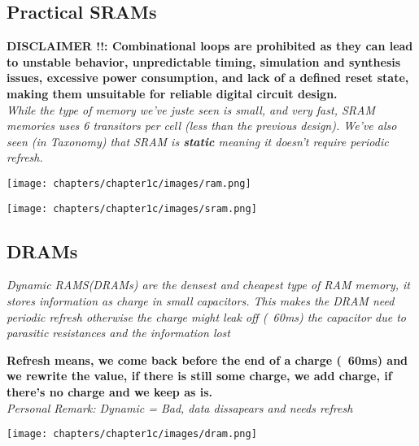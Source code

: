 \subsection{Practical SRAMs}
\textbf{DISCLAIMER !!: Combinational loops are prohibited as they can lead to unstable behavior, unpredictable timing, simulation and synthesis issues, excessive power consumption, and lack of a defined reset state, making them unsuitable for reliable digital circuit design.} \\ \vspace*{5px}
\textit{While the type of memory we've juste seen is small, and very fast, SRAM memories uses 6 transitors per cell (less than the previous design). We've also seen (in Taxonomy) that SRAM is \textbf{static} meaning it doesn't require periodic refresh.} \\ \vspace*{5px}
\begin{minipage}[htp]{0.45\textwidth}
    \begin{center}
        \texttt{[image: chapters/chapter1c/images/ram.png]}
    \end{center}
    \end{minipage}
    \hfill
    \vline
    \hfill
    \begin{minipage}[htp]{0.45\textwidth}
    \begin{center}
        \texttt{[image: chapters/chapter1c/images/sram.png]}
    \end{center}
    \end{minipage}

\subsection{DRAMs}
\textit{Dynamic RAMS(DRAMs) are the densest and cheapest type of RAM memory, it stores information as charge in small capacitors. This makes the DRAM need periodic refresh otherwise the charge might leak off (~60ms) the capacitor due to parasitic resistances and the information lost} \\ \vspace*{5px}

\begin{minipage}[htp]{0.45\textwidth}
    \textbf{Refresh means, we come back before the end of a charge (~60ms) and we rewrite the value, if there is still some charge, we add charge, if there's no charge and we keep as is.} \\ \vspace*{5px}
    \textit{Personal Remark: Dynamic = Bad, data dissapears and needs refresh}
\end{minipage}
\hfill
\vline
\hfill
\begin{minipage}[htp]{0.45\textwidth}
    \begin{center}
        \texttt{[image: chapters/chapter1c/images/dram.png]}
    \end{center}
\end{minipage}

